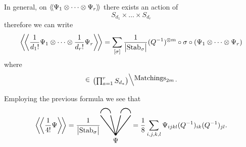 In general, on $ \langle \! \langle { \Psi_1 \otimes \dots \otimes \Psi_r } \rangle \! \rangle$ there exists an action of
\begin{equation*}
  S_{d_1} \times \dots \times S_{d_r}
\end{equation*}
therefore we can write
\begin{equation*}
  \bigg \langle \! \bigg \langle {\frac{1}{d_1!} \Psi_1 \otimes \dots \otimes \frac{1}{d_r!} \Psi_r} \bigg \rangle \! \bigg \rangle
  = \sum_{[\sigma]} \frac{1}{\bigl| \operatorname{Stab}_{\sigma} \bigr|}
  (Q^{-1})^{\otimes m} \circ \sigma \circ (\Psi_1 \otimes \dots \otimes \Psi_r)
\end{equation*}
where
\begin{equation*}
  [\sigma] \in \lbigslant{\bigl( \prod_{a = 1}^r S_{d_a} \bigr)}{\text{Matchings}_{2m}}.
\end{equation*}

\begin{example}
  Employing the previous formula we see that
  \begin{equation*}
    \bigavg{\frac{1}{4!} \Psi} = \frac{1}{\bigl| \Stab_{\sigma} \bigr|}
    \begin{tikzpicture}[scale=.5, baseline=4mm]
      \draw[fill=black] (1.5, .1) circle (1mm);
      \draw[thick] (1.5, 0) node[anchor=north] {$\Psi$} -- (0, 2);
      \draw[thick] (1.5, 0) -- (1, 2);
      \draw[thick] (1.5, 0) -- (2, 2);
      \draw[thick] (1.5, 0) -- (3, 2);
      \draw[thick] (0, 2.2) arc (180:0:.5);
      \draw[thick] (2, 2.2) arc (180:0:.5);
    \end{tikzpicture}
    = \frac{1}{8} \sum_{i, j, k, l} \Psi_{ijkl} (Q^{-1})_{ik} (Q^{-1})_{jl}.
  \end{equation*}
\end{example}

